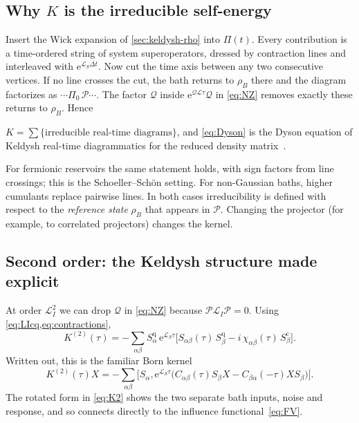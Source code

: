 \documentclass[11pt]{article}
\newcommand{\Lc}{\mathcal{L}}
\newcommand{\Pc}{\mathcal{P}}
\newcommand{\Qc}{\mathcal{Q}}
\newcommand{\ee}{\mathrm{e}}
\newcommand{\cl}{\mathrm{c}}
\newcommand{\qu}{\mathrm{q}}
\newcommand{\rhoB}{\rho_{B}}
\begin{document}
\subsection{Why \texorpdfstring{$K$}{K} is the irreducible self-energy}
Insert the Wick expansion of \cref{sec:keldysh-rho} into $\Pi(t)$. Every contribution is a
time-ordered string of system superoperators, dressed by contraction lines and
interleaved with $\ee^{\Lc_S\Delta t}$. Now cut the time axis between any two
consecutive vertices. If no line crosses the cut, the bath returns to $\rhoB$ there
and the diagram factorizes as $\cdots\Pi_0\,\Pc\cdots$. The factor $\Qc$ inside
$\ee^{\Qc\Lc\tau}\Qc$ in \cref{eq:NZ} removes exactly these returns to $\rhoB$. Hence
\begin{keybox}[Identity]
$K=\sum\{\text{irreducible real-time diagrams}\}$, and \cref{eq:Dyson} is the Dyson
equation of Keldysh real-time diagrammatics for the reduced density
matrix~\cite{SchoellerSchon1994,Konig1996,Schoeller2009,LeijnseWegewijs2008,Timm2008}.
\end{keybox}
For fermionic reservoirs the same statement holds, with sign factors from line
crossings; this is the Schoeller--Sch\"on setting. For non-Gaussian baths, higher
cumulants replace pairwise lines. In both cases irreducibility is defined with respect
to the \emph{reference state} $\rhoB$ that appears in $\Pc$. Changing the projector (for
example, to correlated projectors) changes the kernel.

\subsection{Second order: the Keldysh structure made explicit}
At order $\Lc_I^2$ we can drop $\Qc$ in \cref{eq:NZ} because $\Pc\Lc_I\Pc=0$. Using
\cref{eq:LIcq,eq:contractions},
\begin{equation}
  \boxed{\;K^{(2)}(\tau)=-\sum_{\alpha\beta}S^\qu_\alpha\,\ee^{\Lc_S\tau}
  \Big[S_{\alpha\beta}(\tau)\,S^\qu_\beta-i\,\chi_{\alpha\beta}(\tau)\,S^\cl_\beta\Big].\;}
  \label{eq:K2}
\end{equation}
Written out, this is the familiar Born kernel
\begin{equation}
K^{(2)}(\tau)X=-\sum_{\alpha\beta}\big[S_\alpha,\ee^{\Lc_S\tau}\big(C_{\alpha\beta}(\tau)S_\beta X-C_{\beta\alpha}(-\tau)XS_\beta\big)\big].
\end{equation}
The rotated form in \cref{eq:K2} shows the two separate bath inputs, noise and response,
and so connects directly to the influence functional~\eqref{eq:FV}.
\end{document}
